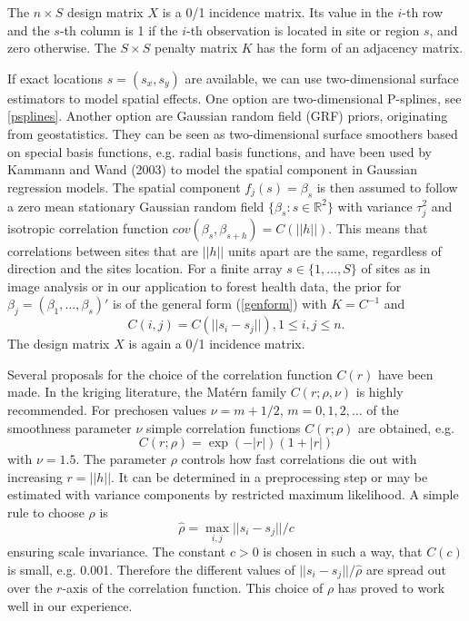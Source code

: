 \documentclass[11pt,a4paper,twoside]{bayesxarticle}
\begin{document}
The $n \times S$ design matrix $X$ is a 0/1 incidence matrix. Its
value in the $i$-th row and the $s$-th column is 1 if the $i$-th
observation is located in site or region $s$, and zero otherwise.
The $S \times S$ penalty matrix $K$ has the form of an adjacency
matrix.

If exact locations $s=(s_x,s_y)$ are available, we can use
two-dimensional surface estimators to model spatial effects. One
option are two-dimensional P-splines, see \autoref{psplines}.
Another option are Gaussian random field (GRF) priors, originating
from geostatistics. They can be seen as two-dimensional surface
smoothers based on special basis functions, e.g. radial basis
functions, and have been used by Kammann and Wand (2003) to model
the spatial component in Gaussian regression models. The spatial
component $f_{j}(s)=\beta_s$ is then assumed to follow a zero
mean stationary Gaussian random field
$\{\beta_s:s\in\mathbb{R}^2\}$ with variance $\tau_{j}^2$ and
isotropic correlation function
$cov(\beta_s,\beta_{s+h})=C(||h||)$. This means that correlations
between sites that are $||h||$ units apart are the same,
regardless of direction and the sites location. For a finite array
$s\in\{1,\ldots,S\}$ of sites as in image analysis or in our
application to forest health data, the prior for
$\beta_j=(\beta_1,\ldots,\beta_s)'$ is of the general form
(\ref{genform}) with $K=C^{-1}$ and
\[C(i,j)=C(||s_i-s_j||), 1\le i,j\le n.\]
The design matrix $X$ is again a 0/1 incidence matrix.

Several proposals for the choice of the correlation function
$C(r)$ have been made. In the kriging literature, the Mat\'{e}rn
family $C(r;\rho,\nu)$ is highly recommended. For prechosen values $\nu=m+1/2$,
$m=0,1,2,\ldots$ of the smoothness parameter $\nu$ simple
correlation functions $C(r;\rho)$ are obtained, e.g.
\[C(r;\rho)=\exp(-|r|)(1+|r|)\]
with $\nu=1.5$. The parameter $\rho$ controls how fast
correlations die out with increasing $r=||h||$. It can be
determined in a preprocessing step or may be estimated with
variance components by restricted maximum likelihood. A simple
rule to choose $\rho$ is
\[\hat{\rho}=\max_{i,j}||s_i-s_j||/c\]
ensuring scale invariance. The constant $c>0$ is chosen in such a
way, that $C(c)$ is small, e.g. 0.001. Therefore the different
values of $||s_i-s_j||/\hat{\rho}$ are spread out over the
$r$-axis of the correlation function. This choice of $\rho$ has
proved to work well in our experience.
\end{document}
